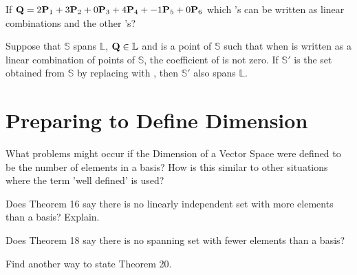 \begin{myexc}[\bd{c}]
	If  $\textbf{Q} = 2\textbf{P}_1+3\textbf{P}_2 + 0\textbf{P}_3 + 4\textbf{P}_4 + -1\textbf{P}_5 + 0\textbf{P}_6$ which 's can be written as linear combinations  and the other 's?
\end{myexc}

\begin{theorem}
	Suppose that $\mathbb{S}$  spans $\mathbb{L}$, $\textbf{Q} \in \mathbb{L}$ and  is a point of $\mathbb{S}$ such that when  is written as a linear combination of points of $\mathbb{S}$, the coefficient of  is not zero. If $\mathbb{S}'$ is the set obtained from $\mathbb{S}$ by replacing  with , then $\mathbb{S}'$ also spans $\mathbb{L}$. 
\end{theorem}
\vspace{-.3in}\hspace{5in}\begin{annotation}
\end{annotation}

\section{Preparing to Define Dimension} \label{Preparing to Define Dimension}


\noindent {}
What problems might occur if the Dimension of a Vector Space were defined to be the number of elements in a basis? How is this similar to other situations where the term 'well defined'  is used?

\begin{myexa}[\bd{a}]
	Does Theorem 16 say there is no linearly independent set with more elements than a basis?  Explain. 
\end{myexa}

\begin{myexb}[\bd{b}]
	Does Theorem 18 say there is no spanning set with fewer elements than a basis? 
\end{myexb}

\begin{myexc}[\bd{c}]
	Find another way to state Theorem 20.
\end{myexc}


